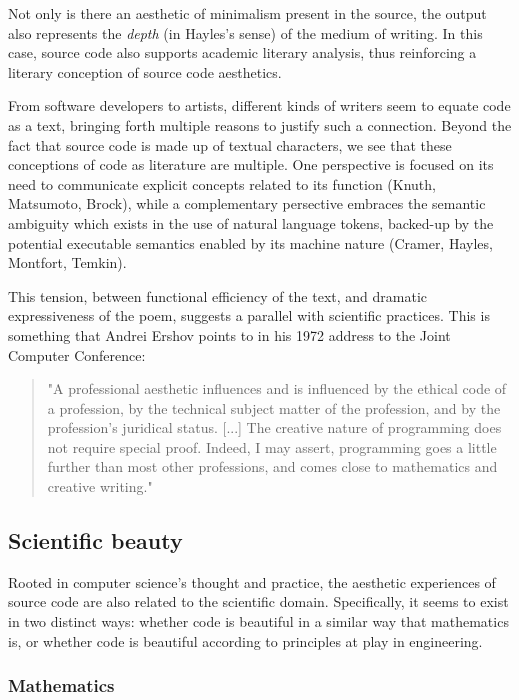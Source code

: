 Not only is there an aesthetic of minimalism present in the source, the output also represents the \emph{depth} (in Hayles's sense) of the medium of writing. In this case, source code also supports academic literary analysis, thus reinforcing a literary conception of source code aesthetics.

From software developers to artists, different kinds of writers seem to equate code as a text, bringing forth multiple reasons to justify such a connection. Beyond the fact that source code is made up of textual characters, we see that these conceptions of code as literature are multiple. One perspective is focused on its need to communicate explicit concepts related to its function (Knuth, Matsumoto, Brock), while a complementary persective embraces the semantic ambiguity which exists in the use of natural language tokens, backed-up by the potential executable semantics enabled by its machine nature (Cramer, Hayles, Montfort, Temkin).

This tension, between functional efficiency of the text, and dramatic expressiveness of the poem, suggests a parallel with scientific practices. This is something that Andrei Ershov points to in his 1972 address to the Joint Computer Conference:

\begin{quote}
  "A professional aesthetic influences and is influenced by the ethical code of a profession, by the technical subject matter of the profession, and by the profession's juridical status. [...] The creative nature  of programming does not require special proof. Indeed, I may assert, programming goes a little further than most other professions, and comes close to mathematics and creative writing." \citep{ershov_aesthetics_1972}
\end{quote}

\subsection{Scientific beauty}
\label{subsec:scientific-beauty}

Rooted in computer science's thought and practice, the aesthetic experiences of source code are also related to the scientific domain. Specifically, it seems to exist in two distinct ways: whether code is beautiful in a similar way that mathematics is, or whether code is beautiful according to principles at play in engineering.

\subsubsection{Mathematics}
\label{subsubsec:beauty-mathematics}

